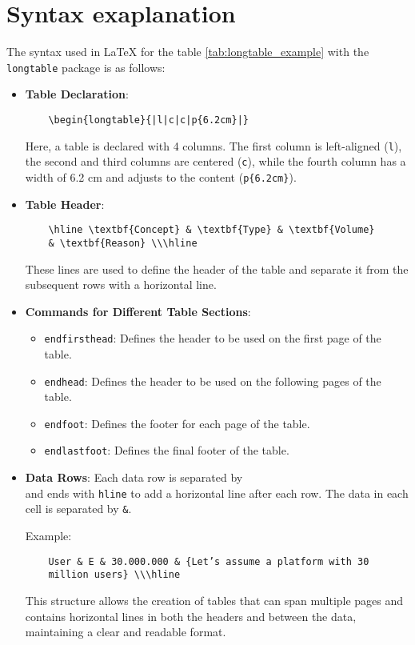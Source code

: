 \section{Syntax exaplanation}
The syntax used in LaTeX for the table \ref{tab:longtable_example} with the \texttt{longtable} package is as follows:

\begin{itemize}
    \item \textbf{Table Declaration}:
    \begin{verbatim}
    \begin{longtable}{|l|c|c|p{6.2cm}|}
    \end{verbatim}
    Here, a table is declared with 4 columns. The first column is left-aligned (\texttt{l}), the second and third columns are centered (\texttt{c}), while the fourth column has a width of 6.2 cm and adjusts to the content (\texttt{p\{6.2cm\}}).

    \item \textbf{Table Header}:
    \begin{verbatim}
    \hline \textbf{Concept} & \textbf{Type} & \textbf{Volume}
    & \textbf{Reason} \\\hline
    \end{verbatim}
    These lines are used to define the header of the table and separate it from the subsequent rows with a horizontal line.

    \item \textbf{Commands for Different Table Sections}:
    \begin{itemize}
        \item \texttt{endfirsthead}: Defines the header to be used on the first page of the table.
        \item \texttt{endhead}: Defines the header to be used on the following pages of the table.
        \item \texttt{endfoot}: Defines the footer for each page of the table.
        \item \texttt{endlastfoot}: Defines the final footer of the table.
    \end{itemize}

    \item \textbf{Data Rows}:
    Each data row is separated by \texttt{\\} and ends with \texttt{hline} to add a horizontal line after each row. The data in each cell is separated by \texttt{\&}.

    Example:
    \begin{verbatim}
    User & E & 30.000.000 & {Let’s assume a platform with 30
    million users} \\\hline
    \end{verbatim}

    This structure allows the creation of tables that can span multiple pages and contains horizontal lines in both the headers and between the data, maintaining a clear and readable format.
\end{itemize}
